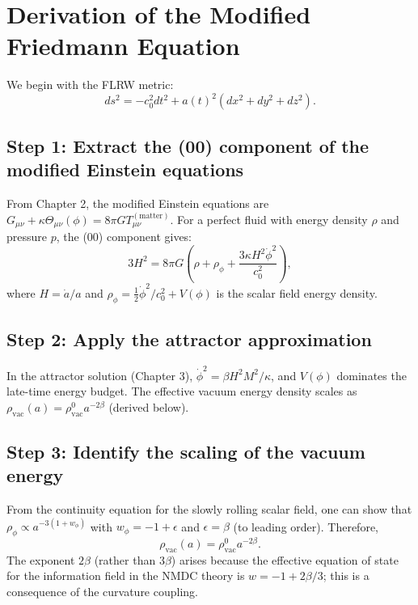 \documentclass[12pt,a4paper]{book}
\theoremstyle{definition}
\theoremstyle{remark}
\begin{document}
\section{Derivation of the Modified Friedmann Equation}

We begin with the FLRW metric:
\begin{equation}
    ds^2 = -c_0^2 dt^2 + a(t)^2 (dx^2 + dy^2 + dz^2).
\end{equation}

\subsection{Step 1: Extract the (00) component of the modified Einstein equations}

From Chapter 2, the modified Einstein equations are $G_{\mu\nu} + \kappa \Theta_{\mu\nu}(\phi) = 8\pi G T_{\mu\nu}^{(\mathrm{matter})}$. For a perfect fluid with energy density $\rho$ and pressure $p$, the (00) component gives:
\begin{equation}
    3H^2 = 8\pi G \left( \rho + \rho_\phi + \frac{3\kappa H^2 \dot{\phi}^2}{c_0^2} \right),
\end{equation}
where $H = \dot{a}/a$ and $\rho_\phi = \frac{1}{2}\dot{\phi}^2/c_0^2 + V(\phi)$ is the scalar field energy density.

\subsection{Step 2: Apply the attractor approximation}

In the attractor solution (Chapter 3), $\dot{\phi}^2 = \beta H^2 M^2/\kappa$, and $V(\phi)$ dominates the late-time energy budget. The effective vacuum energy density scales as $\rho_{\mathrm{vac}}(a) = \rho_{\mathrm{vac}}^0 a^{-2\beta}$ (derived below).

\subsection{Step 3: Identify the scaling of the vacuum energy}

From the continuity equation for the slowly rolling scalar field, one can show that $\rho_\phi \propto a^{-3(1+w_\phi)}$ with $w_\phi = -1 + \epsilon$ and $\epsilon = \beta$ (to leading order). Therefore,
\begin{equation}
    \rho_{\mathrm{vac}}(a) = \rho_{\mathrm{vac}}^0 a^{-2\beta}.
\end{equation}
The exponent $2\beta$ (rather than $3\beta$) arises because the effective equation of state for the information field in the NMDC theory is $w = -1 + 2\beta/3$; this is a consequence of the curvature coupling.
\end{document}

